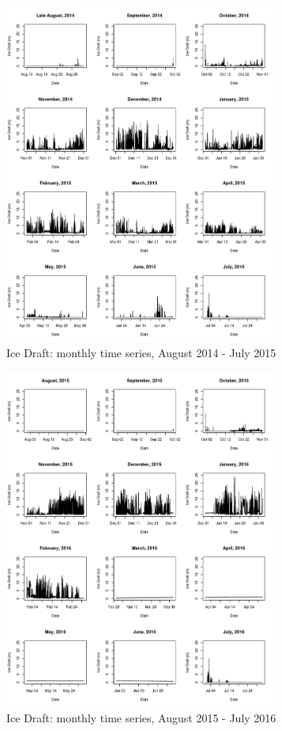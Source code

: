 \documentclass[12pt]{dforeport}
\begin{document}
\begin{figure}  
\centering
\includegraphics[width = 0.8\textwidth]{./figures/63_iceDraft_2014_2015.png}
\caption[Ice Draft, 2014-2015]{Ice Draft: monthly time series, August 2014 - July 2015}
\label{f:id_2014_2015}
\end{figure}

\begin{figure}  
\centering
\includegraphics[width = 0.8\textwidth]{./figures/64_iceDraft_2015_2016.png}
\caption[Ice Draft, 2015-2016]{Ice Draft: monthly time series, August 2015 - July 2016}
\label{f:id_2015_2016}
\end{figure}
\end{document}
